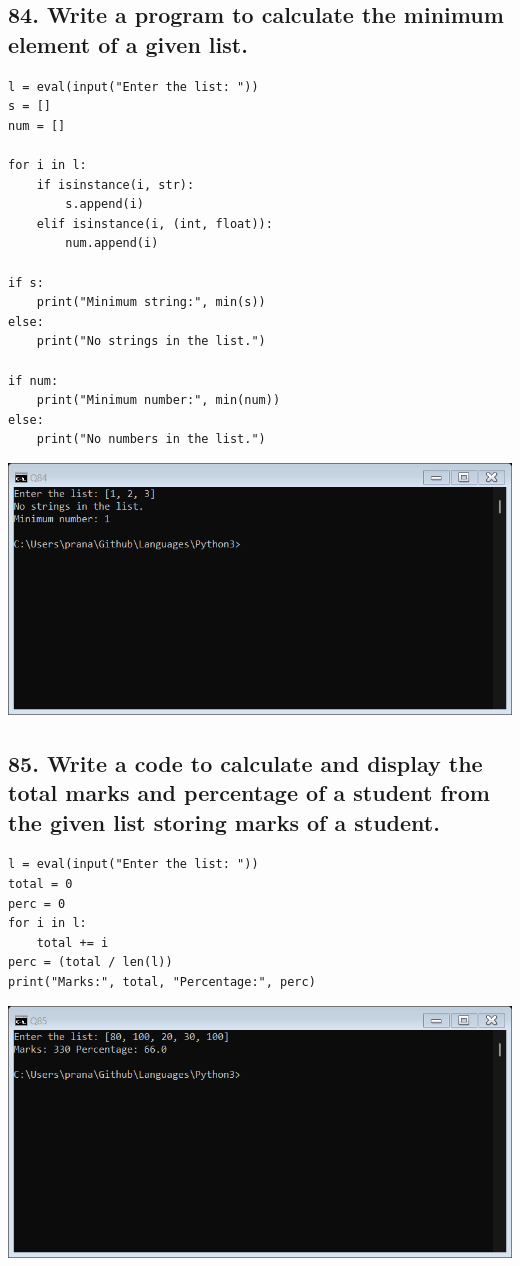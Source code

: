\documentclass[12pt]{article}
\begin{document}
\subsection*{84. Write a program to calculate the minimum element of a given list.}
\begin{verbatim}
l = eval(input("Enter the list: "))
s = []
num = []
    
for i in l:
    if isinstance(i, str): 
        s.append(i)
    elif isinstance(i, (int, float)):
        num.append(i)
    
if s:
    print("Minimum string:", min(s))
else:
    print("No strings in the list.")
    
if num:
    print("Minimum number:", min(num))
else:
    print("No numbers in the list.")    
\end{verbatim}
\includegraphics[width=\linewidth]{images/84.png}

\subsection*{85. Write a code to calculate and display the total marks and percentage of a student from the given list storing marks of a student.}
\begin{verbatim}
l = eval(input("Enter the list: "))
total = 0
perc = 0
for i in l:
    total += i
perc = (total / len(l))
print("Marks:", total, "Percentage:", perc)
\end{verbatim}
\includegraphics[width=\linewidth]{images/85.png}
\end{document}
